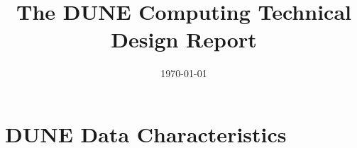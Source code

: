 \documentclass[12pt]{article}
\begin{document}

\title{The DUNE Computing Technical Design Report}

\date{\today}


\maketitle





\newpage
%

\newpage
\tableofcontents

\newpage


\newpage


\newpage
\section{DUNE Data Characteristics}


\newpage


%

\newpage


\newpage


\newpage

\end{document}
